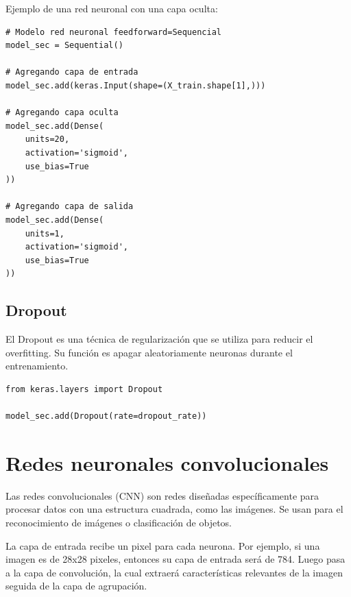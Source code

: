 \documentclass[a4paper, 12pt]{book}
\begin{document}
Ejemplo de una red neuronal con una capa oculta:
\begin{verbatim}
# Modelo red neuronal feedforward=Sequencial
model_sec = Sequential()

# Agregando capa de entrada
model_sec.add(keras.Input(shape=(X_train.shape[1],)))

# Agregando capa oculta
model_sec.add(Dense(
	units=20,
	activation='sigmoid',
	use_bias=True
))

# Agregando capa de salida
model_sec.add(Dense(
	units=1,
	activation='sigmoid',
	use_bias=True
))
\end{verbatim}

\subsection{Dropout}
El Dropout es una técnica de regularización que se utiliza para reducir el overfitting. Su función es apagar aleatoriamente neuronas durante el entrenamiento.
\begin{verbatim}
from keras.layers import Dropout

model_sec.add(Dropout(rate=dropout_rate))
\end{verbatim}

\section{Redes neuronales convolucionales}
Las redes convolucionales (CNN) son redes diseñadas específicamente para procesar datos con una estructura cuadrada, como las imágenes. Se usan para el reconocimiento de imágenes o clasificación de objetos.

La capa de entrada recibe un pixel para cada neurona. Por ejemplo, si una imagen es de 28x28 pixeles, entonces su capa de entrada será de 784. Luego pasa a la capa de convolución, la cual extraerá características relevantes de la imagen seguida de la capa de agrupación.
\end{document}
